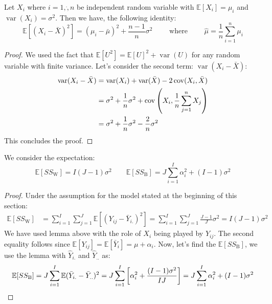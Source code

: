 \begin{lemma}
    Let $X_i$ where $i=1,\dot,n$ be independent random variable with $\mathbb{E}[X_i] = \mu_i$ and $\operatorname{var}(X_i) = \sigma^2$. Then we have, the following identity:
    \begin{equation*}
        \mathbb{E}[(X_i - \bar{X})^2] = (\mu_i - \bar{\mu})^2 + \frac{n-1}{n}\sigma^2 \qquad \text{ where } \qquad \hat{\mu} = \frac{1}{n}\sum^n_{i=1}\mu_i 
    \end{equation*}
\end{lemma}
\begin{proof}
    We used the fact that $\mathbb{E}[U^2] = \mathbb{E}[U]^2 + \operatorname{var}(U)$ for any random variable with finite variance. Let's consider the second term: $\operatorname{var}(X_i - \bar{X})$:
    \begin{equation*}
    \begin{aligned}
        \operatorname{var}(X_i - \bar{X}) &= \operatorname{var}(X_i) + \operatorname{var}(\bar{X}) - 2\operatorname{cov}(X_i, \bar{X}) \\
        &= \sigma^2 + \frac{1}{n}\sigma^2 + \operatorname{cov}\left( X_i, \frac{1}{n}\sum^n_{j=1}X_j \right) \\
        &= \sigma^2 + \frac{1}{n}\sigma^2 - \frac{2}{n}\sigma^2 \\
    \end{aligned}
    \end{equation*}
    This concludes the proof.
\end{proof}

\begin{theorem}
    We consider the expectation:
    \begin{equation*}
        \mathbb{E}[SS_\text{W}] = I(J-1)\sigma^2 \qquad \mathbb{E}[SS_\text{B}] = J\sum^I_{i=1}\alpha_i^2 + (I-1)\sigma^2
    \end{equation*}
\end{theorem}
\begin{proof}
    Under the assumption for the model stated at the beginning of this section:
    \begin{equation*}
    \begin{aligned}
        \mathbb{E}[SS_\text{W}] &= \sum^I_{i=1}\sum^J_{j=1}\mathbb{E}[(Y_{ij} - \bar{Y}_{i.})^2] = \sum^I_{i=1}\sum^J_{j=1}\frac{J-1}{J}\sigma^2 = I(J-1)\sigma^2
    \end{aligned}
    \end{equation*}
    We have used lemma above with the role of $X_i$ being played by $Y_{ij}$. The second equality follows since $\mathbb{E}[Y_{ij}] = \mathbb{E}[\bar{Y}_i] = \mu + \alpha_i$. Now, let's find the $\mathbb{E}[SS_\text{B}]$, we use the lemma with $\hat{Y}_{i.}$ and $\hat{Y}_{..}$ as:
    \begin{equation*}
    \begin{aligned}
        \mathbb{E}[SS_\text{B}] = J\sum^I_{i=1}\mathbb{E}(\bar{Y}_{i.} - \bar{Y}_{..})^2 = J \sum^I_{i=1}\left[ \alpha_i^2 + \frac{(I-1)\sigma^2}{IJ} \right] = J\sum^I_{i=1}\alpha_i^2 + (I-1)\sigma^2
    \end{aligned}
    \end{equation*}
\end{proof}

